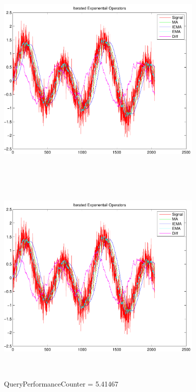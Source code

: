 \documentclass[9pt]{article}
\theoremstyle{plain}
\theoremstyle{definition}
\theoremstyle{remark}
\numberwithin{equation}{section}
\begin{document}
\includegraphics[width=10.0cm,height=10.0cm]{IteratedExponentailOperators.pdf}

\includegraphics[width=10.0cm,height=10.0cm]{IteratedExponentailOperators.pdf}

QueryPerformanceCounter  =  5.41467
\end{document}
